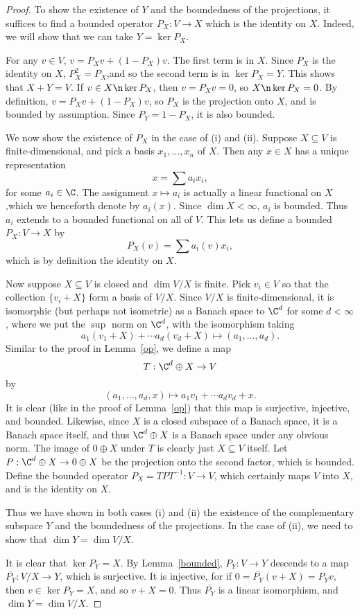 \documentclass[12pt]{article}
\begin{document}
\begin{proof}To show the existence of $Y$ and the boundedness of the projections, it suffices to find a bounded operator $P_X:V \to X$ which is the identity on $X$. Indeed, we will show that we can take $Y = \ker P_X$.

For any $v \in V$, $v = P_X v + (1-P_X)v$. The first term is in $X$. Since $P_X$ is the identity on $X$, $P_X^2 = P_X$,and so the second term is in $\ker P_X = Y$. This shows that $X + Y = V$. If $v \in X\n \ker P_X$, then $v = P_Xv = 0$, so $X\n \ker P_X = 0$. By definition, $v = P_Xv + (1-P_X)v$, so $P_X$ is the projection onto $X$, and is bounded by assumption. Since $P_Y = 1-P_X$, it is also bounded.

We now show the existence of $P_X$ in the case of (i) and (ii). Suppose $X \subseteq V$ is finite-dimensional, and pick a basis $x_1,\ldots, x_n$ of $X$. Then any $x \in X$ has a unique representation 
\[x = \sum a_ix_i,\] for some $a_i \in \C$. The assignment $x \mapsto a_i$ is actually a linear functional on $X$,which we henceforth denote by $a_i(x)$. Since $\dim X< \infty$, $a_i$ is bounded. Thus $a_i$ extends to a bounded functional on all of $V$. This lets us define a bounded $P_X:V \to X$ by 
\[P_X(v) = \sum a_i(v)x_i,\]
which is by definition the identity on $X$.

Now suppose $X \subseteq V$ is closed and $\dim V/X$ is finite. Pick $v_i \in V$ so that the collection $\{v_i+X\}$ form a basis of $V/X$. Since $V/X$ is finite-dimensional, it is isomorphic (but perhaps not isometric) as a Banach space to $\C^d$ for some $d < \infty$, where we put the $\sup$ norm on $\C^d$, with the isomorphism taking
\[a_1(v_1+X)+\cdots a_d(v_d+X) \mapsto (a_1,\ldots,a_d).\]
Similar to the proof in Lemma~\ref{op}, we define a map
\[T: \C^d\oplus X \to V\]  by
\[(a_1,\ldots,a_d,x) \mapsto a_1v_1 + \cdots a_dv_d + x.\]
It is clear (like in the proof of Lemma~\ref{op}) that this map is surjective, injective, and bounded. Likewise, since $X$ is a closed subspace of a Banach space, it is a Banach space itself, and thus $\C^d \oplus X$ is a Banach space under any obvious norm. The image of $0\oplus X$ under $T$ is clearly just $X \subseteq V$ itself. Let $P:\C^d \oplus X \to 0\oplus X$ be the projection onto the second factor, which is bounded. Define the bounded operator $P_X = TPT^{-1}:V \to V$, which certainly maps $V$ into $X$, and is the identity on $X$. 

Thus we have shown in both cases (i) and (ii) the existence of the complementary subspace $Y$ and the boundedness of the projections. In the case of (ii), we need to show that $\dim Y = \dim V/X$.

It is clear that $\ker P_Y = X$. By Lemma~\ref{bounded}, $P_Y:V \to Y$ descends to a map $\overline{P_Y}:V/X \to Y$, which is surjective. It is injective, for if $0 = \overline{P_Y}(v+X) = P_Yv$, then $v \in \ker P_Y = X$, and so $v+X = 0$. Thus $\overline{P_Y}$ is a linear isomorphism, and $\dim Y = \dim V/X$.
\end{proof}
\end{document}
